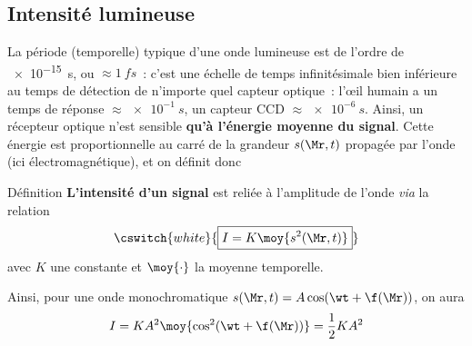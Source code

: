 \documentclass[../main/main.tex]{subfiles}
\begin{document}
\subsection{Intensité lumineuse}
La période (temporelle) typique d'une onde lumineuse est de l'ordre de
\SI{e-15}{s}, ou $\approx \SI{1}{fs}$~: c'est une échelle de temps
infinitésimale bien inférieure au temps de détection de n'importe quel capteur
optique~: l'œil humain a un temps de réponse $\approx \SI{e-1}{s}$, un capteur
CCD $\approx \SI{e-6}{s}$. Ainsi, un récepteur optique n'est sensible
\textbf{qu'à l'énergie moyenne du signal}. Cette énergie est proportionnelle au
carré de la grandeur $s(\Mr,t)$ propagée par l'onde (ici électromagnétique), et
on définit donc
\begin{bdefi}{Définition}
    \textbf{L'intensité d'un signal} est reliée à l'amplitude de l'onde
    \textit{via} la relation
    \[\cswitch{white}{\boxed{I = K \moy{s^2(\Mr,t)}}}\]
    avec $K$ une constante et $\moy{\cdot}$ la moyenne temporelle.
\end{bdefi}
Ainsi, pour une onde monochromatique $s(\Mr,t) = A\cos(\wt+\f(\Mr))$, on aura
\[I = KA^2\moy{\cos^2(\wt+\f(\Mr))} = \frac{1}{2}KA^2\]
\begin{tcolorbox}[boxrule=0pt, frame hidden, interior hidden, sharp corners,
    enhanced, borderline={1pt}{0pt}{BlueViolet!70!black},
    breakable, height fill, hand, valign=center]{}
    \vspace{-10pt}
\end{tcolorbox}
\end{document}
